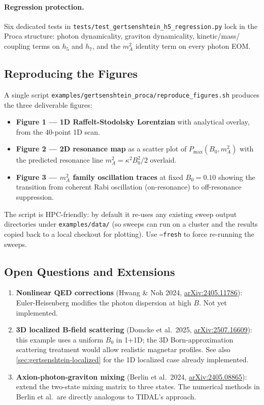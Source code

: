 \paragraph{Regression protection.} Six dedicated tests in
\texttt{tests/test\_gertsenshtein\_h5\_regression.py} lock in the Proca
structure: photon dynamicality, graviton dynamicality, kinetic/mass/
coupling terms on $h_5$ and $h_7$, and the $m_A^2$ identity term on
every photon EOM.

\subsection{Reproducing the Figures}
\label{subsec:proca-reproduce}

A single script \texttt{examples/gertsenshtein\_proca/reproduce\_figures.sh}
produces the three deliverable figures:

\begin{itemize}
  \item \textbf{Figure 1 --- 1D Raffelt-Stodolsky Lorentzian} with
    analytical overlay, from the 40-point 1D scan.
  \item \textbf{Figure 2 --- 2D resonance map} as a scatter plot of
    $P_{\max}(B_0, m_A^2)$ with the predicted resonance line $m_A^2 =
    \kappa^2 B_0^2 / 2$ overlaid.
  \item \textbf{Figure 3 --- $m_A^2$ family oscillation traces} at fixed
    $B_0 = 0.10$ showing the transition from coherent Rabi oscillation
    (on-resonance) to off-resonance suppression.
\end{itemize}

The script is HPC-friendly: by default it re-uses any existing sweep
output directories under \texttt{examples/data/} (so sweeps can run on
a cluster and the results copied back to a local checkout for plotting).
Use \texttt{--fresh} to force re-running the sweeps.

\subsection{Open Questions and Extensions}
\label{subsec:proca-extensions}

\begin{enumerate}
  \item \textbf{Nonlinear QED corrections} (Hwang \& Noh 2024,
    \href{https://arxiv.org/abs/2405.11786}{arXiv:2405.11786}):
    Euler-Heisenberg modifies the photon dispersion at high $B$. Not
    yet implemented.
  \item \textbf{3D localized B-field scattering} (Domcke et al.\ 2025,
    \href{https://arxiv.org/abs/2507.16609}{arXiv:2507.16609}): this
    example uses a uniform $B_0$ in 1+1D; the 3D Born-approximation
    scattering treatment would allow realistic magnetar profiles. See
    also \cref{sec:gertsenshtein-localized} for the 1D localized case
    already implemented.
  \item \textbf{Axion-photon-graviton mixing} (Berlin et al.\ 2024,
    \href{https://arxiv.org/abs/2405.08865}{arXiv:2405.08865}): extend
    the two-state mixing matrix to three states. The numerical methods
    in Berlin et al.\ are directly analogous to TIDAL's approach.
\end{enumerate}
